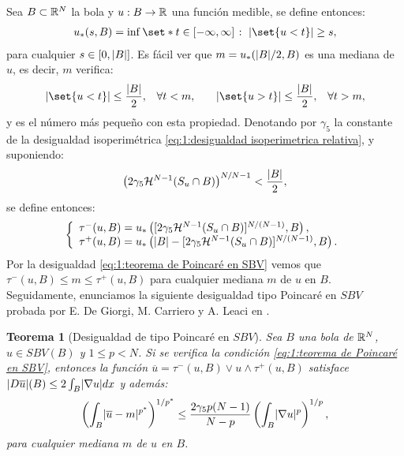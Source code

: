 \documentclass[a4paper,11pt,spanish, twoside, leqno]{tfm-uam}
\newtheorem{teo}{Teorema}[chapter]
\begin{document}
Sea $B\subset\mathbb{R}^{N}$ la bola y $u:B\to \mathbb{R}$ una función medible, se define entonces:
\begin{align*}
u_{*}(s,B)=\inf\set*{t\in [-\infty, \infty]\given \abs{\set{u<t}}\geq s},
\end{align*}
para cualquier $s\in [0,\lvert B\rvert]$. Es fácil ver que $m=u_{*}(\lvert B\rvert/2,B)$ es una mediana de $u$, es decir, $m$ verifica:
\begin{align*}
\begin{array}{lllll}
\abs{\set{u<t}}\leq \dfrac{\abs{B}}{2},& \forall t<m, &&\abs{\set{u>t}}\leq \dfrac{\abs{B}}{2},& \forall t>m,
\end{array}
\end{align*}
y es el número más pequeño con esta propiedad. Denotando por $\gamma_{5}$ la constante de la desigualdad isoperimétrica \ref{eq:1:desigualdad isoperimetrica relativa}, y suponiendo:
\begin{align}\label{eq:1:teorema de Poincaré en SBV}
\left(2\gamma_{5}\mathcal{H}^{N-1}(S_{u}\cap B)\right)^{N/N-1}<\dfrac{\lvert B\rvert}{2},
\end{align}
se define entonces:
\begin{align}\label{eq:1:taus}
\left\{ \begin{array}{l}
\tau^{-}(u,B)=u_{*}\left( [2	\gamma_{5}\mathcal{H}^{N-1}(S_{u}\cap B)]^{N/(N-1)},B\right),\\
\tau^{+}(u,B)=u_{*}\left( \lvert B\rvert-[2\gamma_{5}\mathcal{H}^{N-1}(S_{u}\cap B)]^{N/(N-1)},B\right).\end{array} \right . 
\end{align}
Por la desigualdad \ref{eq:1:teorema de Poincaré en SBV} vemos que $\tau^{-}(u,B)\leq m\leq \tau^{+}(u,B)$ para cualquier mediana $m$ de $u$ en $B$. Seguidamente, enunciamos la siguiente desigualdad tipo Poincaré en $SBV$ probada por E. De Giorgi, M. Carriero y A. Leaci en \cite{de1989existence}.
\begin{teo}[Desigualdad de tipo Poincaré en $SBV$]\label{teo:Desigualdad de tipo Poincaré en SBV}  
Sea $B$ una bola de $\mathbb{R}^{N}$, $u\in SBV(B)$ y $1\leq p<N$. Si se verifica la condición \ref{eq:1:teorema de Poincaré en SBV}, entonces la función $\overline{u}=\tau^{-}(u,B)\vee u\wedge \tau^{+}(u,B)$ satisface $\lvert D\overline{u}\rvert(B)\leq 2 \int_{B}\lvert\nabla{u}\rvert dx$ y además:
\begin{align}\label{teo:Desigualdad de tipo Poincaré en SBV:eq:1}
\left ( \int_{B} \lvert\overline{u}-m\rvert^{p^{*}}\right )^{1/p^{*}}\leq \dfrac{2\gamma_{5}p(N-1)}{N-p}\left ( \int_{B}\lvert\nabla{u}\rvert^{p}\right )^{1/p},
\end{align}
para cualquier mediana $m$ de $u$ en $B$.
\end{teo}
\end{document}
